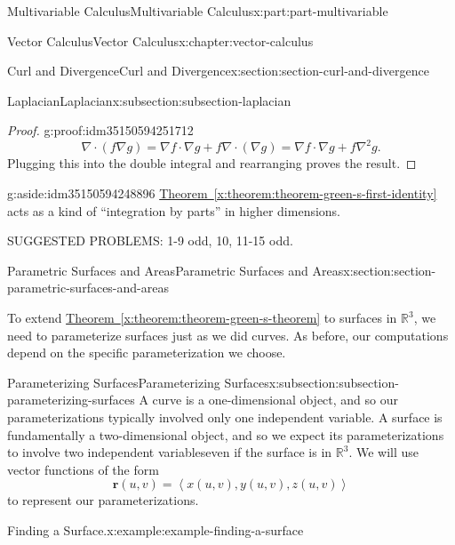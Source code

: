 \documentclass[twoside,10pt,]{tufte-book}
\newcommand{\xreffont}{\relax}
\numberwithin{equation}{part}
\newcommand{\RR}{\mathbb{R}}
\newcommand{\grad}{\nabla}
\renewcommand{\div}{\nabla\cdot}
\newcommand{\del}{\nabla}
\newcommand{\vb}[1]{\mathbf{#1}}
\newcommand{\dotprod}[1]{\left\langle #1 \right\rangle}
\begin{document}
\begin{partptx}{Multivariable Calculus}{}{Multivariable Calculus}{}{}{x:part:part-multivariable}
\begin{chapterptx}{Vector Calculus}{}{Vector Calculus}{}{}{x:chapter:vector-calculus}
\begin{sectionptx}{Curl and Divergence}{}{Curl and Divergence}{}{}{x:section:section-curl-and-divergence}
\begin{subsectionptx}{Laplacian}{}{Laplacian}{}{}{x:subsection:subsection-laplacian}
\begin{proof}{}{g:proof:idm35150594251712}
\begin{equation*}
\div(f\grad g) = \grad f\cdot \grad g + f \div(\grad g) = \grad f\cdot\grad g + f\del^{2}g\text{.}
\end{equation*}
Plugging this into the double integral and rearranging proves the result.%
\end{proof}
\begin{aside}{}{g:aside:idm35150594248896}%
\hyperref[x:theorem:theorem-green-s-first-identity]{Theorem~{\xreffont\ref{x:theorem:theorem-green-s-first-identity}}} acts as a kind of ``integration by parts'' in higher dimensions.%
\end{aside}
\end{subsectionptx}
\begin{conclusion}{}%
SUGGESTED PROBLEMS: 1-9 odd, 10, 11-15 odd.%
\end{conclusion}%
\end{sectionptx}
%
%
\typeout{************************************************}
\typeout{************************************************}
%
\begin{sectionptx}{Parametric Surfaces and Areas}{}{Parametric Surfaces and Areas}{}{}{x:section:section-parametric-surfaces-and-areas}
\begin{introduction}{}%
To extend \hyperref[x:theorem:theorem-green-s-theorem]{Theorem~{\xreffont\ref{x:theorem:theorem-green-s-theorem}}} to surfaces in \(\RR^{3}\), we need to parameterize surfaces just as we did curves. As before, our computations depend on the specific parameterization we choose.%
\end{introduction}%
%
%
\typeout{************************************************}
\typeout{************************************************}
%
\begin{subsectionptx}{Parameterizing Surfaces}{}{Parameterizing Surfaces}{}{}{x:subsection:subsection-parameterizing-surfaces}
A curve is a one-dimensional object, and so our parameterizations typically involved only one independent variable. A surface is fundamentally a two-dimensional object, and so we expect its parameterizations to involve two independent variables\textemdash{}even if the surface is in \(\RR^{3}\). We will use vector functions of the form%
\begin{equation*}
\vb{r}(u,v) = \dotprod{x(u,v), y(u,v), z(u,v)}
\end{equation*}
to represent our parameterizations.%
\begin{example}{Finding a Surface.}{x:example:example-finding-a-surface}%

\end{example}
\end{subsectionptx}
\end{sectionptx}
\end{chapterptx}
\end{partptx}
\end{document}
